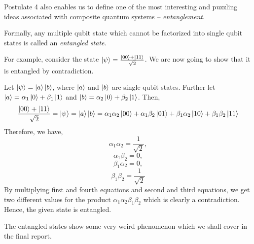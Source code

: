 Postulate 4 also enables us to define one of the most interesting and puzzling ideas associated with composite quantum systems – \textit{entanglement}.
\vspace{1em}

Formally, any multiple qubit state which cannot be factorized into single qubit states is called an \textit{entangled state}.
\vspace{1em}

For example, consider the state $\ket{\psi} = \frac{\ket{00} + \ket{11}}{\sqrt{2}}$. We are now going to show that it is entangled by contradiction.
\vspace{1em}

Let $\ket{\psi} = \ket{a}\ket{b}$, where $\ket{a}$ and $\ket{b}$ are single qubit states.
Further let $\ket{a} = \alpha_1\ket{0} + \beta_1\ket{1}$ and $\ket{b} = \alpha_2\ket{0} + \beta_2\ket{1}$.
Then,
    $$\frac{\ket{00} + \ket{11}}{\sqrt{2}} = \ket{\psi} = \ket{a}\ket{b} = \alpha_1\alpha_2\ket{00} + \alpha_1\beta_2\ket{01} + \beta_1\alpha_2\ket{10} + \beta_1\beta_2\ket{11}$$
Therefore, we have,
    $$\alpha_1\alpha_2 = \frac{1}{\sqrt{2}},$$
    $$\alpha_1\beta_2 = 0,$$
    $$\beta_1\alpha_2 = 0,$$
    $$\beta_1\beta_2 = \frac{1}{\sqrt{2}}$$
By multiplying first and fourth equations and second and third equations, we get two different values for the product $\alpha_1\alpha_2\beta_1\beta_2$ which is clearly a contradiction. Hence, the given state is entangled.
\vspace{1em}

The entangled states show some very weird phenomenon which we shall cover in the final report.